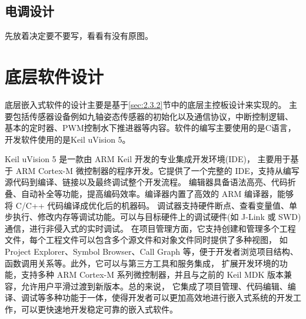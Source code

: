 \subsection{电调设计}
先放着决定要不要写，看看有没有原图。
\section{底层软件设计}
底层嵌入式软件的设计主要是基于\ref{sec:2.3.2}节中的底层主控板设计来实现的。
主要包括传感器设备例如九轴姿态传感器的初始化以及通信协议，中断控制逻辑、
基本的定时器、PWM控制水下推进器等内容。软件的编写主要使用的是C语言，开发软件使用的是Keil uVision 5。

Keil uVision 5 是一款由 ARM Keil 开发的专业集成开发环境(IDE)，
主要用于基于 ARM Cortex-M 微控制器的程序开发。它提供了一个完整的 IDE，支持从编写源代码到编译、链接以及最终调试整个开发流程。
编辑器具备语法高亮、代码折叠、自动补全等功能，提高编码效率。编译器内置了高效的 ARM 编译器，能够将 C/C++ 代码编译成优化后的机器码。
调试器支持硬件断点、查看变量值、单步执行、修改内存等调试功能。可以与目标硬件上的调试硬件(如 J-Link 或 SWD)通信，进行非侵入式的实时调试。
在项目管理方面，它支持创建和管理多个工程文件，每个工程文件可以包含多个源文件和对象文件同时提供了多种视图，
如 Project Explorer、Symbol Browser、Call Graph 等，便于开发者浏览项目结构、函数调用关系等。此外，它可以与第三方工具和服务集成，
扩展开发环境的功能，支持多种 ARM Cortex-M 系列微控制器，并且与之前的 Keil MDK 版本兼容，允许用户平滑过渡到新版本。总的来说，
它集成了项目管理、代码编辑、编译、调试等多种功能于一体，使得开发者可以更加高效地进行嵌入式系统的开发工作，可以更快速地开发稳定可靠的嵌入式软件。

